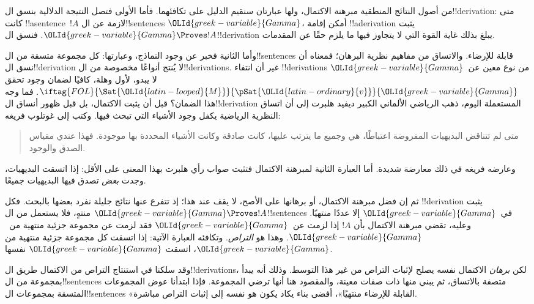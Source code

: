 \documentclass[../../../include/open-logic-section]{subfiles}
\begin{document}
      {}
      {}


من أصول النتائج المنطقية مبرهنة الاكتمال، ولها عبارتان سنقيم الدليل
على تكافئهما. فأما الأولى فتصل النتيجة الدلالية بنسق ال!!{derivation}:
متى كانت !!a{sentence}~$!A$ لازمة عن ال!!{sentence}s $\OLId{greek-variable}{Gamma}$، أمكن
إقامة !!a{derivation} يثبت $\OLId{greek-variable}{Gamma} \Proves !A$. فنسق ال!!{derivation}
يبلغ بذلك غاية القوة التي لا يتجاوز فيها ما يلزم حقًا عن المقدمات.

وأما الثانية فخبر عن وجود النماذج، وعبارتها: كل مجموعة متسقة من
ال!!{sentence}s قابلة للإرضاء. والاتساق من مفاهيم نظرية البرهان؛ فمعناه
أن نسق ال!!{derivation} لا يُنتج أنواعًا مخصوصة من ال!!{derivation}s.
غير أن انتفاء !!{derivation}s من نوع معين عن~$\OLId{greek-variable}{Gamma}$ لا يبدو، لأول
وهلة، كافيًا لضمان وجود
تحقق $\iftag{FOL}{\Sat{\OLId{latin-looped}{M}}}{\pSat{\OLId{latin-ordinary}{v}}}{\OLId{greek-variable}{Gamma}}$. فما وجه هذا الضمان؟
قبل أن يثبت الاكتمال، بل قبل ظهور أنساق ال!!{derivation} المستعملة
اليوم، ذهب الرياضي الألماني الكبير ديفيد هلبرت إلى أن اتساق النظرية
الرياضية يكفل وجود الأشياء التي تبحث فيها. وكتب إلى غوتلوب فريغه:
\begin{quote}
  متى لم تتناقض البديهيات المفروضة اعتباطًا، هي وجميع ما يترتب عليها،
  كانت صادقة وكانت الأشياء المحددة بها موجودة. فهذا عندي مقياس الصدق
  والوجود.
\end{quote}
وعارضه فريغه في ذلك معارضة شديدة. أما العبارة الثانية لمبرهنة
الاكتمال فتثبت صواب رأي هلبرت بهذا المعنى على الأقل: إذا اتسقت
البديهيات، وجدت \emph{بعض}
 تصدق فيها البديهيات جميعًا.

ثم إن فضل مبرهنة الاكتمال، أو برهانها على الأصح، لا يقف عند هذا؛ إذ
تتفرع عنها نتائج جليلة نفرد بعضها بالبحث. فكل
!!{derivation} يثبت $\OLId{greek-variable}{Gamma} \Proves !A$ منتهٍ، فلا يستعمل من
ال!!{sentence}s في~$\OLId{greek-variable}{Gamma}$ إلا عددًا منتهيًا. وعليه، تقضي مبرهنة
الاكتمال بأن $!A$ إذا لزمت عن~$\OLId{greek-variable}{Gamma}$ فقد لزمت عن مجموعة جزئية
منتهية من~$\OLId{greek-variable}{Gamma}$. وهذا هو \emph{التراص}. وتكافئه العبارة الآتية:
إذا اتسقت كل مجموعة جزئية منتهية من $\OLId{greek-variable}{Gamma}$، اتسقت $\OLId{greek-variable}{Gamma}$ نفسها.

وقد سلكنا في استنتاج التراص من الاكتمال طريق ال!!{derivation}s، لكن
\emph{برهان} الاكتمال نفسه يصلح لإثبات التراص من غير هذا التوسط.
وذلك أنه يبدأ بمجموعة من ال!!{sentence}s متصفة بالاتساق، ثم يبني
منها  ذات صفات معينة،
والمقصود هنا أنها ترضي المجموعة. فإذا ابتدأنا عوض المجموعات المتسقة
بمجموعات ال!!{sentence}s «القابلة للإرضاء منتهيًا»، أفضى بناء يكاد
يكون هو نفسه إلى إثبات التراص مباشرة.
\end{document}
